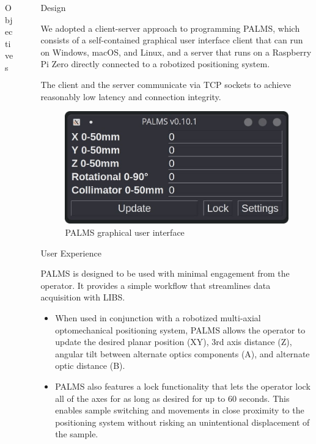 \documentclass[final, aspectratio=158]{beamer}
\newlength{\sepwidth}
\newlength{\colwidth}
\newcommand{\separatorcolumn}{\begin{column}{\sepwidth}\end{column}}
\begin{document}
\begin{frame}[t]
\begin{columns}[t]
\begin{column}{\colwidth}
\begin{alertblock}{Objectives}
  \end{alertblock}

\end{column}

\separatorcolumn

\begin{column}{\colwidth}

  \begin{block}{Design}

    We adopted a client-server approach to programming PALMS\@, 
    which consists of a self-contained graphical user interface client that can run on 
    Windows, 
    macOS, 
    and Linux, 
    and a server that runs on a Raspberry Pi Zero 
    directly connected to a robotized positioning system.

    The client and the server communicate via TCP sockets to achieve reasonably low latency and connection integrity.

    \begin{figure}
      \centering
      \includegraphics[scale=0.7]{palms-gui}
      \caption{PALMS graphical user interface}
    \end{figure}

  \end{block}

  \begin{block}{User Experience}

    PALMS is designed to be used with minimal engagement from the operator.
    It provides a simple workflow that streamlines data acquisition with LIBS.

    \begin{itemize}
      \item When used in conjunction with a robotized multi-axial optomechanical positioning system, 
      PALMS allows the operator to update the 
      desired planar position (XY), 
      3rd axis distance (Z), 
      angular tilt between alternate optics components (A), 
      and alternate optic distance (B).
      \item PALMS also features a lock functionality that lets the operator lock all of the axes for as long as desired for up to 60 seconds. 
      This enables sample switching 
      and movements in close proximity to the positioning system without risking an unintentional displacement of the sample.


\end{itemize}
\end{block}
\end{column}
\end{columns}
\end{frame}
\end{document}
